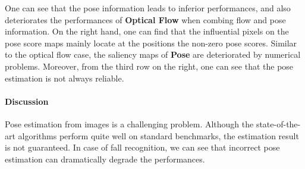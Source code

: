 \documentclass[runningheads]{llncs}
\begin{document}
One can see that the pose information leads to inferior performances, and also deteriorates the performances of {\bf Optical Flow} when combing flow and pose information. On the right hand, one can find that the influential pixels on the pose score maps mainly locate at the positions the non-zero pose scores. Similar to the optical flow case, the saliency maps of {\bf Pose} are deteriorated by numerical problems. Moreover, from the third row on the right, one can see that the pose estimation is not always reliable. 


\paragraph{Discussion}
Pose estimation from images is a challenging problem. Although the state-of-the-art algorithms perform quite well on standard benchmarks, the estimation result is not guaranteed. In case of fall recognition, we can see that incorrect pose estimation can dramatically degrade the performances. 
\end{document}
